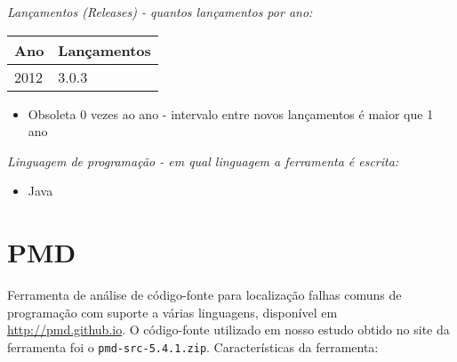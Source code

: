 \begin{description}

  \item {\it Lançamentos ({\it Releases}) - quantos lançamentos por ano:}
    \begin{table}[h!]
      \centering
      \begin{tabular}{| l | l |}
        \hline
        Ano  & Lançamentos \\
        \hline
        2012 & 3.0.3       \\
        \hline
      \end{tabular}
    \end{table}
    \begin{itemize}
      \item Obsoleta $0$ vezes ao ano - intervalo entre novos lançamentos é maior que 1 ano
    \end{itemize}

  \item {\it Linguagem de programação - em qual linguagem a ferramenta é escrita:}
    \begin{itemize}
      \item Java
    \end{itemize}

\end{description}

\section{PMD}

Ferramenta de análise de código-fonte para localização falhas comuns de
programação com suporte a várias linguagens, disponível em
\url{http://pmd.github.io}.  O código-fonte utilizado em nosso estudo obtido
no site da ferramenta foi o \texttt{pmd-src-5.4.1.zip}. Características da
ferramenta:

